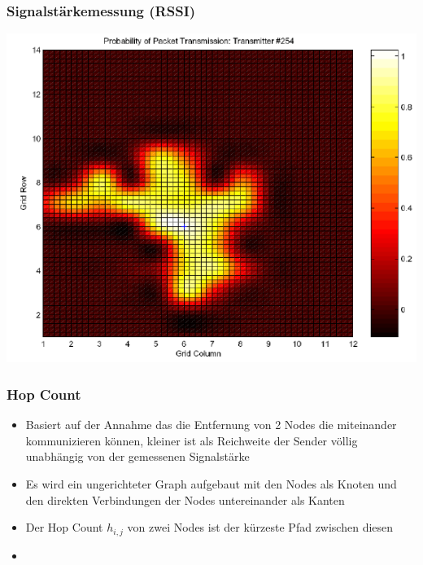 \begin{frame}
\frametitle{Signalstärkemessung (RSSI)}
  \begin{center}
  \includegraphics[scale=0.5]{img/RSSI1}

  \end{center}
\end{frame}

\begin{frame}
\frametitle{Hop Count}

\begin{itemize}
  \item Basiert auf der Annahme das die Entfernung von 2 Nodes die
    miteinander kommunizieren können, kleiner ist als Reichweite der
    Sender völlig unabhängig von der gemessenen Signalstärke
  \item Es wird ein ungerichteter Graph aufgebaut mit den Nodes als
    Knoten und den direkten Verbindungen der Nodes untereinander als
    Kanten
  \item Der Hop Count $h_{i,j}$ von zwei Nodes ist der kürzeste Pfad
    zwischen diesen
  \item 
\end{itemize}
\end{frame}

